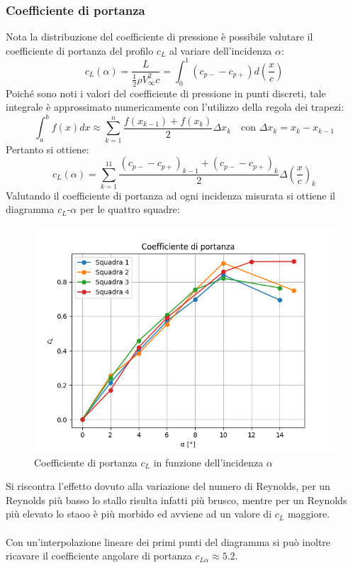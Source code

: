 \newpage
\subsubsection{Coefficiente di portanza}
Nota la distribuzione del coefficiente di pressione è possibile valutare il coefficiente di portanza del profilo $c_L$ al variare dell'incidenza $\alpha$:
\begin{equation*}
    c_L(\alpha) = \frac{L}{\frac12 \rho V_\infty^2 c} = \int_0^1 (c_{p-}-c_{p+})d\left( \frac xc \right)
\end{equation*}  
Poiché sono noti i valori del coefficiente di pressione in punti discreti, tale integrale è approssimato numericamente con l'utilizzo della regola dei trapezi:
\begin{equation*}
    \int_a^b f(x)dx \approx \sum_{k=1}^n \frac{f(x_{k-1}) + f(x_k)}2 \Delta x_k \quad \text{con } \Delta x_k = x_k - x_{k-1}
\end{equation*}
Pertanto si ottiene:
\begin{equation*}
    c_L(\alpha) = \sum_{k=1}^{11} \frac{(c_{p-}-c_{p+})_{k-1}+(c_{p-}-c_{p+})_k}2 \Delta \left( \frac xc \right)_k
\end{equation*}
Valutando il coefficiente di portanza ad ogni incidenza misurata si ottiene il diagramma $c_L$-$\alpha$ per le quattro squadre:
\begin{figure}[H]
    \centering
    \includegraphics[width=.75\textwidth]{images/5/cl.png}
    \caption{Coefficiente di portanza $c_L$ in funzione dell'incidenza $\alpha$}
\end{figure}

\noindent Si riscontra l'effetto dovuto alla variazione del numero di Reynolds, per un Reynolds più basso lo stallo risulta infatti più brusco, mentre per un Reynolds più elevato lo staoo è più morbido ed avviene ad un valore di $c_L$ maggiore.\\\\
Con un'interpolazione lineare dei primi punti del diagramma si può inoltre ricavare il coefficiente angolare di portanza $c_{L\alpha}\approx5.2$.

